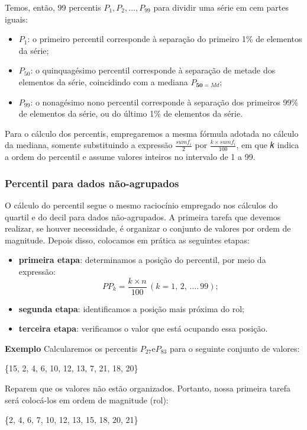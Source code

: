 Temos, então, 99 percentis \(P_1 , P_2, \dots, P_{99}\) para dividir uma série em cem partes iguais:
\begin{itemize}
    \item \(P_1\): o primeiro percentil corresponde à separação do primeiro 1\% de elementos da série;
    \item \(P_50\): o quinquagésimo percentil corresponde à separação de metade dos elementos da série, coincidindo com a mediana \(P_{𝟓𝟎 = Md}\);
    \item \(P_99\): o nonagésimo nono percentil corresponde à separação dos primeiros 99\% de elementos da série, ou do último 1\% de elementos da série.
\end{itemize}

Para o cálculo dos percentis, empregaremos a mesma fórmula adotada no cálculo da mediana, somente substituindo a expressão \(\frac{sum f_i}{2}\) por \(\frac{k\times sum f_i}{100}\), em que 𝑘 indica a ordem do percentil e assume valores inteiros no
intervalo de 1 a 99.

\subsubsection{Percentil para dados não-agrupados}

O cálculo do percentil segue o mesmo raciocínio empregado nos cálculos do quartil e do decil para dados não-agrupados. A primeira tarefa que devemos realizar, se houver necessidade, é organizar o conjunto de valores por ordem de magnitude. Depois disso, colocamos em prática as seguintes etapas:
    \begin{itemize}
    \item \textbf{primeira etapa}: determinamos a posição do percentil, por meio da expressão:
\[
    P{P_k}=\frac{k\times n}{100}\, (k= 1,\,2,\,\dots.\,99);
\]
    \item \textbf{segunda etapa}: identificamos a posição mais próxima do rol;
    \item \textbf{terceira etapa}: verificamos o valor que está ocupando essa posição.
\end{itemize}

\textbf{Exemplo}
Calcularemos os percentis \(P_{27} \text{e} P_{83}\) para o seguinte conjunto de valores:
\begin{center}
    {\{15, 2, 4, 6, 10, 12, 13, 7, 21, 18, 20\}}
\end{center}
Reparem que os valores não estão organizados. Portanto, nossa primeira tarefa será colocá-los em ordem de magnitude (rol):
\begin{center}
    \{{2, 4, 6, 7, 10, 12, 13, 15, 18, 20, 21}\}
\end{center}


